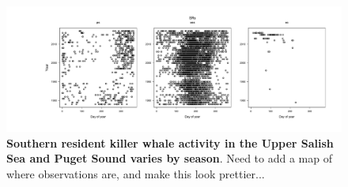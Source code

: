 \documentclass{article}
\begin{document}
\begin{figure}[p]
\includegraphics{../analyses/figures/OrcaPhenPlots/SRKW_yr_doy.pdf} 
\caption{\textbf{Southern resident killer whale activity in the Upper Salish Sea and Puget Sound varies by season}. Need to add a map of where observations are, and make this look prettier...}
 \label{fig:phenplot}
 \end{figure}
 
\end{document}
